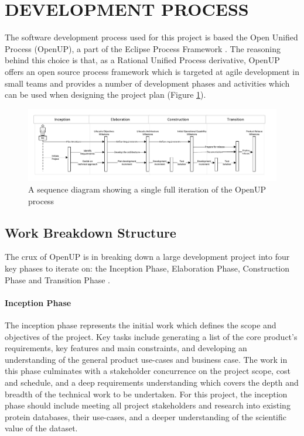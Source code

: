 \section{DEVELOPMENT PROCESS \hrulefill}

The software development process used for this project is based the Open Unified
Process (OpenUP), a part of the Eclipse Process Framework \cite{EclipseND}. The
reasoning behind this choice is that, as a Rational Unified Process derivative,
OpenUP offers an open source process framework which is targeted at agile
development in small teams and provides a number of development phases and
activities which can be used when designing the project plan (Figure
\ref{fig:sequence-openup}).

\begin{figure}[H]
\centering
\includegraphics[width=7.5in]{assets/sequence-openup.pdf}
\caption{A sequence diagram showing a single full iteration of the OpenUP
  process}
\label{fig:sequence-openup}
\end{figure}

\subsection{Work Breakdown Structure}
The crux of OpenUP is in breaking down a large development project into four key
phases to iterate on: the Inception Phase, Elaboration Phase, Construction Phase
and Transition Phase \cite{Rational2011}.

\paragraph{Inception Phase} The inception phase represents the initial work
which defines the scope and objectives of the project. Key tasks include
generating a list of the core product's requirements, key features and main
constraints, and developing an understanding of the general product use-cases
and business case. The work in this phase culminates with a stakeholder
concurrence on the project scope, cost and schedule, and a deep requirements
understanding which covers the depth and breadth of the technical work to be
undertaken. For this project, the inception phase should include meeting all
project stakeholders and research into existing protein databases, their
use-cases, and a deeper understanding of the scientific value of the dataset.


